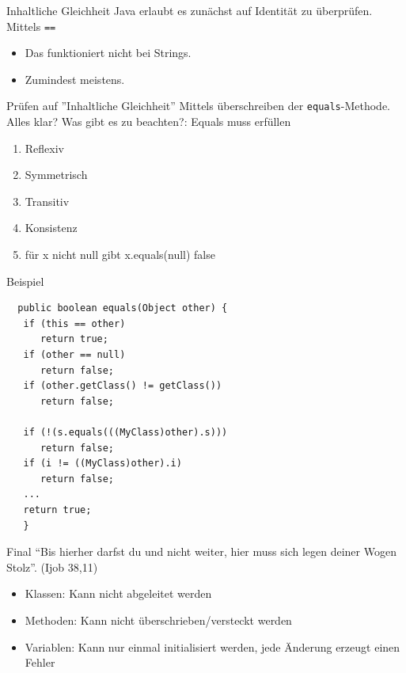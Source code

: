 \documentclass[18pt]{beamer}
\begin{document}
\begin{frame}[fragile]{Inhaltliche Gleichheit}
 Java erlaubt es zunächst auf Identität zu überprüfen.
 Mittels \verb|==|
 \begin{itemize}
  \item Das funktioniert nicht bei Strings.
  \item Zumindest meistens.
 \end{itemize}
\end{frame}
\begin{frame}[fragile]{Prüfen auf ''Inhaltliche Gleichheit''}
 Mittels überschreiben der \verb|equals|-Methode. Alles klar? \pause
 Was gibt es zu beachten?:
 Equals muss erfüllen
 \begin{enumerate}
  \item Reflexiv
  \item Symmetrisch
  \item Transitiv
  \item Konsistenz
  \item für x nicht null gibt x.equals(null) false
 \end{enumerate}
\end{frame}

\begin{frame}[fragile]{Beispiel}
 \begin{lstlisting}
  public boolean equals(Object other) {
   if (this == other)
      return true;
   if (other == null)
      return false;
   if (other.getClass() != getClass())
      return false;

   if (!(s.equals(((MyClass)other).s)))
      return false;
   if (i != ((MyClass)other).i)
      return false;
   ...
   return true;
   } 
 \end{lstlisting}
\end{frame}

\begin{frame}{Final}
``Bis hierher darfst du und nicht weiter, hier muss sich legen deiner Wogen Stolz''. (Ijob 38,11)
  \pause
  
  \begin{itemize}
   \item Klassen: Kann nicht abgeleitet werden
   \item Methoden: Kann nicht überschrieben/versteckt werden
   \item Variablen: Kann nur einmal initialisiert werden, jede Änderung erzeugt einen Fehler
  \end{itemize}
\end{frame}
\end{document}

